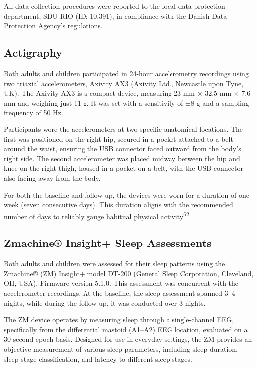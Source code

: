 \documentclass[
  9pt,
]{scrbook}
\begin{document}
All data collection procedures were reported to the local data
protection department, SDU RIO (ID: 10.391), in compliance with the
Danish Data Protection Agency's regulations.

\hypertarget{actigraphy}{%
\subsection{Actigraphy}\label{actigraphy}}

Both adults and children participated in 24-hour accelerometry
recordings using two triaxial accelerometers, Axivity AX3 (Axivity Ltd.,
Newcastle upon Tyne, UK). The Axivity AX3 is a compact device, measuring
23 mm × 32.5 mm × 7.6 mm and weighing just 11 g. It was set with a
sensitivity of ±8 g and a sampling frequency of 50 Hz.

Participants wore the accelerometers at two specific anatomical
locations. The first was positioned on the right hip, secured in a
pocket attached to a belt around the waist, ensuring the USB connector
faced outward from the body's right side. The second accelerometer was
placed midway between the hip and knee on the right thigh, housed in a
pocket on a belt, with the USB connector also facing away from the body.

For both the baseline and follow-up, the devices were worn for a
duration of one week (seven consecutive days). This duration aligns with
the recommended number of days to reliably gauge habitual physical
activity\textsuperscript{\protect\hyperlink{ref-jaeschke_variability_2018}{62}}.

\hypertarget{zmachine-insight-sleep-assessments}{%
\subsection{Zmachine® Insight+ Sleep
Assessments}\label{zmachine-insight-sleep-assessments}}

Both adults and children were assessed for their sleep patterns using
the Zmachine® (ZM) Insight+ model DT-200 (General Sleep Corporation,
Cleveland, OH, USA), Firmware version 5.1.0. This assessment was
concurrent with the accelerometer recordings. At the baseline, the sleep
assessment spanned 3--4 nights, while during the follow-up, it was
conducted over 3 nights.

The ZM device operates by measuring sleep through a single-channel EEG,
specifically from the differential mastoid (A1--A2) EEG location,
evaluated on a 30-second epoch basis. Designed for use in everyday
settings, the ZM provides an objective measurement of various sleep
parameters, including sleep duration, sleep stage classification, and
latency to different sleep stages.
\end{document}
